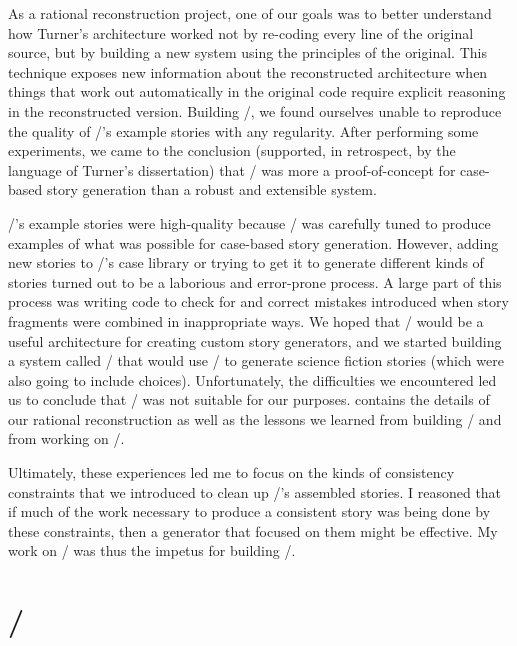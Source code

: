 As a rational reconstruction project, one of our goals was to better understand how Turner's architecture worked not by re-coding every line of the original source, but by building a new system using the principles of the original.
%
This technique exposes new information about the reconstructed architecture when things that work out automatically in the original code require explicit reasoning in the reconstructed version.
%
Building \skald/, we found ourselves unable to reproduce the quality of \minstrel/'s example stories with any regularity.
%
After performing some experiments, we came to the conclusion (supported, in retrospect, by the language of Turner's dissertation) that \minstrel/ was more a proof-of-concept for case-based story generation than a robust and extensible system.


\minstrel/'s example stories were high-quality because \minstrel/ was carefully tuned to produce examples of what was possible for case-based story generation.
%
However, adding new stories to \minstrel/'s case library or trying to get it to generate different kinds of stories turned out to be a laborious and error-prone process.
%
A large part of this process was writing code to check for and correct mistakes introduced when story fragments were combined in inappropriate ways.
%
We hoped that \skald/ would be a useful architecture for creating custom story generators, and we started building a system called \problemplanets/ that would use \skald/ to generate science fiction stories (which were also going to include choices).
%
Unfortunately, the difficulties we encountered led us to conclude that \skald/ was not suitable for our purposes.
%
 contains the details of our rational reconstruction as well as the lessons we learned from building \skald/ and from working on \problemplanets/.


Ultimately, these experiences led me to focus on the kinds of consistency constraints that we introduced to clean up \skald/'s assembled stories.
%
I reasoned that if much of the work necessary to produce a consistent story was being done by these constraints, then a generator that focused on them might be effective. 
%
My work on \skald/ was thus the impetus for building \dunyazad/.



\section{\dunyazad/}

